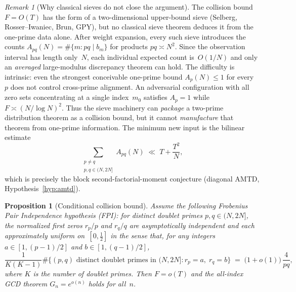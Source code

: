 \documentclass[11pt]{article}
\newtheorem{proposition}[theorem]{Proposition}
\theoremstyle{definition}
\theoremstyle{remark}
\newtheorem{remark}[theorem]{Remark}
\begin{document}
\begin{remark}[Why classical sieves do not close the argument]
\label{rem:sieve-limitation}
The collision bound $F = O(T)$ has the form of
a two-dimensional upper-bound sieve
(Selberg, Rosser--Iwaniec, Brun, GPY),
but no classical sieve theorem
deduces it from the one-prime data alone.
After weight expansion, every such sieve
introduces the counts
$A_{pq}(N) = \#\{m : pq \mid b_m\}$
for products $pq \asymp N^2$.
Since the observation interval has length only~$N$,
each individual expected count is~$O(1/N)$
and only an \emph{averaged} large-modulus
discrepancy theorem can hold.
The difficulty is intrinsic: even the strongest
conceivable one-prime bound $A_p(N) \le 1$
for every~$p$ does not control cross-prime
alignment.
An adversarial configuration with all zero sets
concentrating at a single index~$m_0$
satisfies $A_p = 1$ while $F \asymp (N/\log N)^2$.
Thus the sieve machinery can \emph{package}
a two-prime distribution theorem as a
collision bound, but it cannot
\emph{manufacture} that theorem from
one-prime information.
The minimum new input is the bilinear estimate
\begin{equation}\label{eq:bfm2}
  \sum_{\substack{p \ne q \\ p,q \in (N,2N]}}
  A_{pq}(N)
  \;\ll\;
  T + \frac{T^2}{N},
\end{equation}
which is precisely the block second-factorial-moment
conjecture (diagonal AMTD,
Hypothesis~\ref{hyp:amtd}).
\end{remark}

\begin{proposition}[Conditional collision bound]
\label{prop:conditional-collision}
Assume the following \emph{Frobenius Pair Independence}
hypothesis (FPI):
for distinct doublet primes $p, q \in (N, 2N]$,
the normalized first zeros $r_p/p$ and $r_q/q$
are asymptotically independent and
each approximately uniform on~$[0, \tfrac12]$
in the sense that, for any integers
$a \in [1, (p{-}1)/2]$ and $b \in [1, (q{-}1)/2]$,
\begin{equation}\label{eq:fpi}
  \frac{1}{K(K-1)}
  \#\bigl\{(p,q)\text{ distinct doublet primes in $(N,2N]$}
  : r_p = a,\; r_q = b\bigr\}
  \;=\;
  \bigl(1 + o(1)\bigr)\,\frac{4}{pq},
\end{equation}
where $K$ is the number of doublet primes.
Then $F = o(T)$ and the all-index GCD theorem
$G_n = e^{o(n)}$ holds for all~$n$.
\end{proposition}
\end{document}
